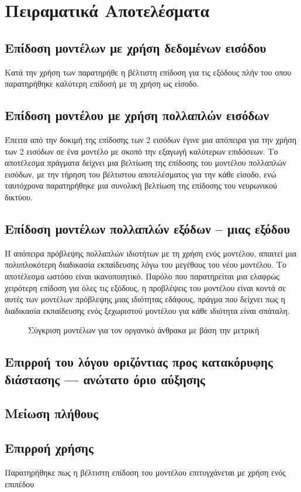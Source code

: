 \chapter{Πειραματικά Αποτελέσματα}
\label{ch:experiments_results}

\section{Επίδοση μοντέλων με χρήση δεδομένων εισόδου }
Κατά την χρήση των  παρατηρήθε η βέλτιστη επίδοση για τις εξόδους  πλήν του  οπου παρατηρήθηκε καλύτερη επίδοσή με τη χρήση  ως είσοδο.

\section{Επίδοση μοντέλου με χρήση πολλαπλών εισόδων}
Έπειτα από την δοκιμή της επίδοσης των 2 εισόδων έγινε μια απόπειρα για την χρήση των 2 εισόδων σε ένα μοντέλο με σκοπό την εξαγωγή καλύτερων επιδόσεων. Το αποτέλεσμα πράγματα δείχνει μια βελτίωση της επίδοσης του μοντέλου πολλαπλών εισόδων, με την τήρηση του βέλτιστου αποτελέσματος για την κάθε είσοδο, ενώ ταυτόχρονα παρατηρήθηκε μια συνολική βελτίωση της επίδοσης του νευρωνικού δικτύου.

\section{Επίδοση μοντέλων πολλαπλών εξόδων -- μιας εξόδου}
Η απόπειρα πρόβλεψης πολλαπλών ιδιοτήτων με τη χρήση ενός μοντέλου, απαιτεί μια πολυπλοκότερη διαδικασία εκπαίδευσης λόγω του μεγέθους του νέου μοντέλου. Το αποτέλεσμα ωστόσο είναι ικανοποιητικό. Παρόλο που παρατηρείται μια ελαφρώς χειρότερη επίδοση για όλες τις εξόδους, η προβλέψεις του μοντέλου είναι κοντά σε αυτές των μοντέλων πρόβλεψης μιας ιδιότητας εδάφους, πράγμα που δείχνει πως η διαδικασία εκπαίδευσης ενός ξεχωριστού μοντέλου για κάθε ιδιότητα είναι σπάταλη.

\begin{figure}[htbp]
  \centering
  
  \caption{Σύγκριση μοντέλων για τον οργανικό άνθρακα με βάση την μετρική }
\end{figure}

\section{Επιρροή του λόγου οριζόντιας προς κατακόρυφης διάστασης --- ανώτατο όριο αύξησης}


\section{Μείωση πλήθους }

\section{Επιρροή χρήσης }
Παρατηρήθηκε πως η βέλτιστη επίδοση του μοντέλου επιτυγχάνεται με χρήση ενός επιπέδου  